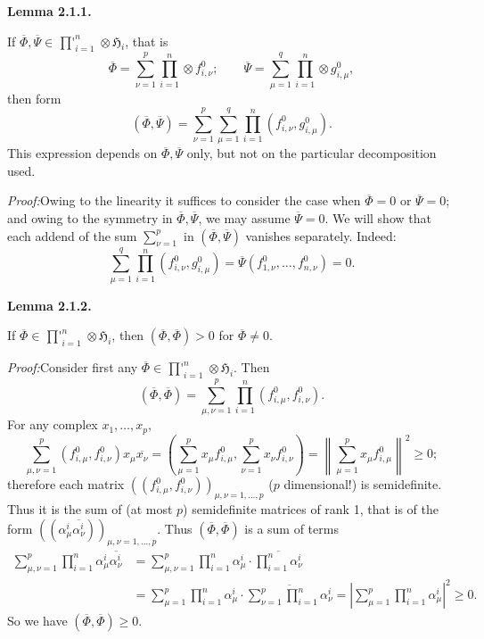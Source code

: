\documentclass[12pt,b5paper,twoside]{article}
\newcommand{\Hspace}{\mathfrak H}
\newcommand{\Lemma}[1]{%
  \par\smallskip\noindent\phantomsection\label{lem:#1}\textbf{Lemma #1.}\enspace
}
\newcommand{\Proof}{\par\noindent\textit{Proof:}\enspace}
\begin{document}
\Lemma{2.1.1}
If $\overline{\Phi},\overline{\Psi}\in
\mathop{\prod\nolimits'}_{i=1}^{n}\otimes\Hspace_i$, that is
\[
 \overline{\Phi}=\sum_{\nu=1}^{p}\prod_{i=1}^{n}\otimes f_{i,\nu}^0;
 \qquad
 \overline{\Psi}=\sum_{\mu=1}^{q}\prod_{i=1}^{n}\otimes g_{i,\mu}^0,
\]
then form
\[
 (\overline{\Phi},\overline{\Psi})=
 \sum_{\nu=1}^{p}\sum_{\mu=1}^{q}
              \prod_{i=1}^{n}(f_{i,\nu}^0,g_{i,\mu}^0).
\]
This expression depends on $\overline{\Phi},\overline{\Psi}$ only, but not on the particular
decomposition used.

\Proof Owing to the linearity it suffices to consider the case when
$\overline{\Phi}=0$ or $\overline{\Psi}=0$; and owing to the symmetry in
$\overline{\Phi},\overline{\Psi}$, we may assume $\overline{\Psi}=0$.
We will show that each addend of the sum $\sum_{\nu=1}^{p}$ in
$(\overline{\Phi},\overline{\Psi})$
vanishes separately. Indeed:
\[
 \sum_{\mu=1}^{q}\prod_{i=1}^{n}(f_{i,\nu}^0,g_{i,\mu}^0)
 =\overline{\Psi}(f_{1,\nu}^0,\ldots,f_{n,\nu}^0)=0.
\]

\Lemma{2.1.2}
If $\overline{\Phi}\in\mathop{\prod\nolimits'}_{i=1}^{n}
\otimes\Hspace_i$, then
$(\overline{\Phi},\overline{\Phi})>0$ for $\overline{\Phi}\ne0$.

\Proof Consider first any
$\overline{\Phi}\in\mathop{\prod\nolimits'}_{i=1}^{n}
\otimes\Hspace_i$. Then
\[
 (\overline{\Phi},\overline{\Phi})=\sum_{\mu,\nu=1}^{p}
              \prod_{i=1}^{n}(f_{i,\mu}^0,f_{i,\nu}^0).
\]
For any complex $x_1,\ldots,x_p$,
\[
 \sum_{\mu,\nu=1}^{p}(f_{i,\mu}^0,f_{i,\nu}^0)x_\mu\overline{x_\nu}
 =\left(\sum_{\mu=1}^{p}x_\mu f_{i,\mu}^0,
        \sum_{\nu=1}^{p}x_\nu f_{i,\nu}^0\right)
 =\left\lVert\sum_{\mu=1}^{p}x_\mu f_{i,\mu}^0\right\rVert^2\geq0;
\]
therefore each matrix
$((f_{i,\mu}^0,f_{i,\nu}^0))_{\mu,\nu=1,\ldots,p}$ ($p$ dimensional!) is
semidefinite. Thus it is the sum of (at most $p$) semidefinite matrices of
rank 1, that is of the form
$((\alpha_\mu^i\overline{\alpha_\nu^i}))_{\mu,\nu=1,\ldots,p}$. Thus
$(\overline{\Phi},\overline{\Phi})$ is a sum of terms
\begin{align*}
 \sum_{\mu,\nu=1}^{p}\prod_{i=1}^{n}
       \alpha_\mu^i\overline{\alpha_\nu^i}
 &=\sum_{\mu,\nu=1}^{p}\prod_{i=1}^{n}\alpha_\mu^i
       \cdot\overline{\prod_{i=1}^{n}\alpha_\nu^i}\\
 &=\sum_{\mu=1}^{p}\prod_{i=1}^{n}\alpha_\mu^i
       \cdot\overline{\sum_{\nu=1}^{p}\prod_{i=1}^{n}\alpha_\nu^i}
  =\left|\sum_{\mu=1}^{p}\prod_{i=1}^{n}\alpha_\mu^i\right|^2\geq0.
\end{align*}
So we have $(\overline{\Phi},\overline{\Phi})\geq0$.
\end{document}
